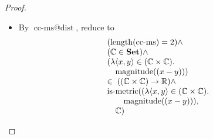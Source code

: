 \documentclass[11pt]{article}
\theoremstyle{plain}
\begin{document}
\begin{proof}
\begin{itemize}[leftmargin=2.8em, itemsep=4pt, parsep=1pt]
  \item[\textbf{3}] By $\operatorname{cc\text{-}ms@dist}$, reduce to
\begin{equation*}
\begin{array}{@{}l@{}} (\operatorname{length}(\operatorname{cc\text{-}ms}) = 2) \wedge \\ (\mathbb{C} \in \mathbf{Set}) \wedge \\ (\lambda \langle x, y \rangle \in (\mathbb{C} \times \mathbb{C}).\; \\ \quad \operatorname{magnitude}((x - y))) \\ \in\; ((\mathbb{C} \times \mathbb{C}) \to \mathbb{R}) \wedge \\ \operatorname{is\text{-}metric}((\lambda \langle x, y \rangle \in (\mathbb{C} \times \mathbb{C}).\; \\ \quad \quad \operatorname{magnitude}((x - y))), \\ \quad \mathbb{C}) \end{array}
\end{equation*}


\end{itemize}
\end{proof}
\end{document}

